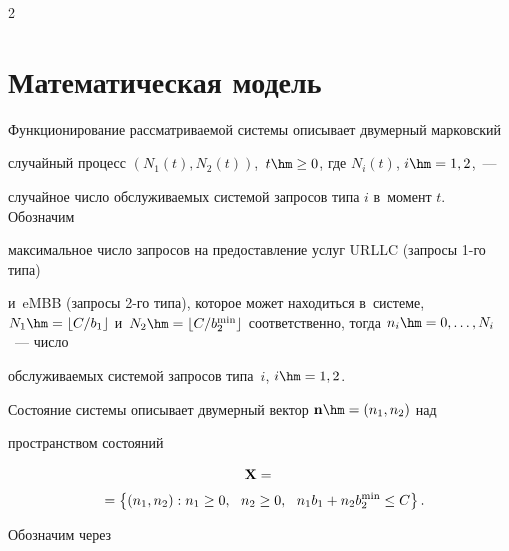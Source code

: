 \begin{multicols}{2}
\begin{equation*}
\end{equation*}





\section{Математическая модель}





Функционирование рассматриваемой сис\-те\-мы описывает двумерный марковский 


случайный процесс $(N_1(t), N_2(t))$,\ $t \hm\geq 0$, где $N_i(t)$, $i \hm= 1,2$,~---


случайное чис\-ло об\-слу\-жи\-ва\-емых сис\-те\-мой запросов типа $i$ в~момент $t$. Обозначим 


максимальное чис\-ло запросов на предоставление услуг URLLC (за\-про\-сы 1-го типа) 


и~eMBB (запросы 2-го типа), которое может находиться в~сис\-те\-ме, $N_1 \hm= \lfloor 


C/b_1 \rfloor$ и~$N_2\hm = \lfloor C/b_2^{\min} \rfloor$ соответственно, тогда $n_i \hm= 0,\ldots,N_i$~--- чис\-ло 


об\-слу\-жи\-ва\-емых сис\-те\-мой за\-про\-сов типа~$i$, $i\hm = 1,2$.


Состояние сис\-те\-мы описывает двумерный век\-тор $\mathbf{n}\hm=(n_1,n_2)$ над 


пространством со\-сто\-яний








\vspace*{-6pt}





\noindent


\begin{multline*}


\mathbf{X} = {}\\[2pt]


\!{}=\left\{ (n_1,n_2): n_1 \geq 0,\ \  n_2 \geq 0,\ \ n_1 b_1 + n_2 b_2^{\min} \leq 


C \right\}.\hspace*{-5.19798pt}




\end{multline*}


Обозначим через 






\end{multicols}
